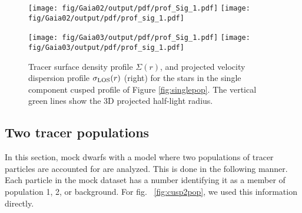 \begin{figure*}
    \begin{center}
        \texttt{[image: fig/Gaia02/output/pdf/prof\_Sig\_1.pdf]}
        \texttt{[image: fig/Gaia02/output/pdf/prof\_sig\_1.pdf]}

        \texttt{[image: fig/Gaia03/output/pdf/prof\_Sig\_1.pdf]}
        \texttt{[image: fig/Gaia03/output/pdf/prof\_sig\_1.pdf]}
        \caption{\label{fig:Sigsiglos1pop} Tracer
          surface density profile $\Sigma(r)$, and
          projected velocity dispersion profile
          $\sigma_{\text{LOS}}(r)$ (right) for the stars in
          the single component cusped profile of
          Figure \ref{fig:singlepop}. The vertical
          green lines show the 3D projected
          half-light radius.}
    \end{center}
\end{figure*}

\subsection{Two tracer populations}

In this section, mock dwarfs with a model where
two populations of tracer particles are accounted
for are analyzed. This is done in the following
manner. Each particle in the mock dataset has a
number identifying it as a member of population 1,
2, or background. For fig.  ~\ref{fig:cusp2pop},
we used this information directly.

